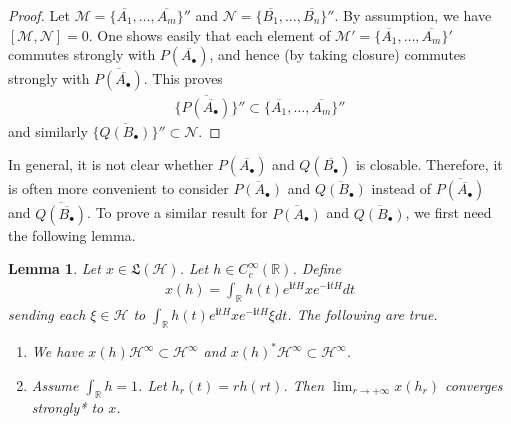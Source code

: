 \documentclass[12pt,b5paper,notitlepage]{article}
\theoremstyle{definition}
\theoremstyle{plain}
\newtheorem{lm}[df]{Lemma}
\newcommand{\fk}{\mathfrak}
\newcommand{\mc}{\mathcal}
\newcommand{\ovl}{\overline}
\newcommand{\im}{\mathbf{i}}
\newcommand{\blt}{\bullet}
\newcommand{\Rbb}{\mathbb R}
\newcommand{\dps}{\displaystyle}
\numberwithin{equation}{section}
\begin{document}

\begin{proof}
Let $\mc M=\{\ovl{A_1},\dots,\ovl{A_m}\}''$ and $\mc N=\{\ovl{B_1},\dots,\ovl{B_n}\}''$. By assumption, we have $[\mc M,\mc N]=0$. One shows easily that each element of $\mc M'=\{\ovl{A_1},\dots,\ovl{A_m}\}'$ commutes strongly with $P(\ovl{A_\blt})$, and hence (by taking closure) commutes strongly with $\ovl{P(\ovl{A_\blt})}$. This proves
\begin{align}
\{\ovl{P(\ovl{A_\blt})}\}''\subset\{\ovl{A_1},\dots,\ovl{A_m}\}''
\end{align}
and similarly $\{\ovl{Q(B_\blt)}\}''\subset\mc N$.
\end{proof}


In general, it is not clear whether $P(\ovl{A_\blt})$ and $Q(\ovl{B_\blt})$ is closable. Therefore, it is often more convenient to consider $\ovl{P(A_\blt)}$ and $\ovl{Q(B_\blt)}$ instead of $\ovl{P(\ovl{A_\blt})}$ and $\ovl{Q(\ovl{B_\blt})}$. To prove a similar result for $\ovl{P(A_\blt)}$ and $\ovl{Q(B_\blt)}$, we first need the following lemma.



\begin{lm}\label{lb64}
Let $x\in\fk L(\mc H)$. Let $h\in C_c^\infty(\Rbb)$. Define
\begin{align}
x(h)=\int_\Rbb h(t)e^{\im tH}xe^{-\im tH}dt
\end{align}
sending each $\xi\in\mc H$ to $\int_\Rbb h(t)e^{\im tH}xe^{-\im tH}\xi dt$. The following are true.
\begin{enumerate}
\item We have $x(h)\mc H^\infty\subset\mc H^\infty$ and $x(h)^*\mc H^\infty\subset\mc H^\infty$.
\item Assume  $\int_\Rbb h=1$. Let $h_r(t)=r h(r t)$. Then $\dps\lim_{r\rightarrow+\infty}x(h_r)$ converges strongly* to $x$.
\end{enumerate}
\end{lm}
\end{document}
